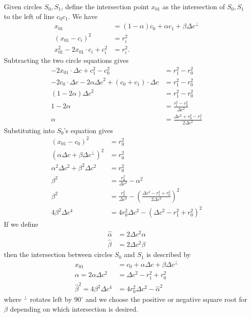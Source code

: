 \documentclass[11pt]{article}
\begin{document}
Given circles $S_0, S_1$, define the intersection point $x_{01}$ as the intersection
of $S_0,S_1$ to the left of line $c_0c_1$.  We have
\begin{align*}
x_{01} &= (1-\alpha) c_0 + \alpha c_1 + \beta \Delta c^\perp \\
(x_{01} - c_i)^2 &= r_i^2 \\
x_{01}^2 - 2x_{01} \cdot c_i + c_i^2 &= r_i^2.
\end{align*}
Subtracting the two circle equations gives
\begin{align*}
-2x_{01} \cdot \Delta c + c_1^2 - c_0^2 &= r_1^2 - r_0^2 \\
-2c_0 \cdot \Delta c -2\alpha {\Delta c}^2 + (c_0 + c_1) \cdot \Delta c &= r_1^2 - r_0^2 \\
(1-2\alpha) {\Delta c}^2 &= r_1^2 - r_0^2 \\
1 - 2 \alpha &= \frac{r_1^2 - r_0^2}{\Delta c^2} \\
\alpha &= \frac{\Delta c^2 + r_0^2 - r_1^2}{2 \Delta c^2}
\end{align*}
Substituting into $S_0$'s equation gives
\begin{align*}
(x_{01} - c_0)^2 &= r_0^2 \\
\left(\alpha \Delta c + \beta \Delta c^\perp \right)^2 &= r_0^2 \\
\alpha^2 \Delta c^2 + \beta^2 \Delta c^2 &= r_0^2 \\
\beta^2 &= \frac{r_0^2}{\Delta c^2} - \alpha^2 \\
\beta^2 &= \frac{r_0^2}{\Delta c^2} - \left(\frac{\Delta c^2 - r_1^2 + r_0^2}{2 \Delta c^2}\right)^2 \\
4 \beta^2 \Delta c^4 &= 4 r_0^2 \Delta c^2 - \left( \Delta c^2 - r_1^2 + r_0^2 \right)^2
\end{align*}
If we define
\begin{align*}
\hat{\alpha} &= 2 \Delta c^2 \alpha \\
\hat{\beta} &= 2 \Delta c^2 \beta
\end{align*}
then the intersection between circles $S_0$ and $S_1$ is described by
\begin{align*}
x_{01} &= c_0 + \alpha \Delta c + \beta \Delta c^\perp \\
\hat{\alpha} = 2 \alpha \Delta c^2 &= \Delta c^2 - r_1^2 + r_0^2 \\
\hat{\beta}^2 = 4 \beta^2 \Delta c^4 &= 4 r_0^2 \Delta c^2 - \hat{\alpha}^2
\end{align*}
where $^\perp$ rotates left by $90^\circ$ and we choose the positive or negative square root for $\beta$ depending on which intersection is desired.
\end{document}

